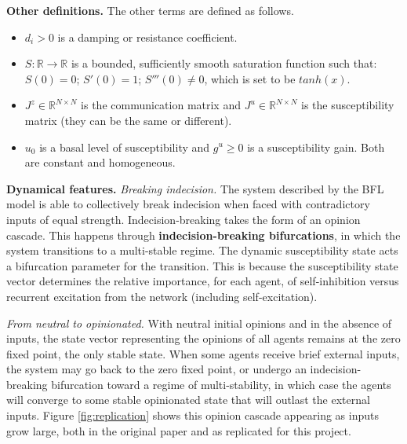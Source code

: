 \documentclass[]{article}
\begin{document}
\textbf{Other definitions.} The other terms are defined as follows. \begin{itemize}
	\item $d_{i} > 0$ is a damping or resistance coefficient. 
	\item $S: \mathbb{R} \rightarrow \mathbb{R}$ is a bounded, sufficiently smooth saturation function such that: $S(0)=0$; $S'(0)=1$; $S'''(0)\neq0$, which is set to be $tanh(x)$.
	\item $J^z \in \mathbb{R}^{N \times N}$ is the communication matrix and $J^u \in \mathbb{R}^{N \times N}$ is the susceptibility matrix (they can be the same or different).
	\item $u_0$ is a basal level of susceptibility and $g^u \geq 0$ is a susceptibility gain. Both are constant and homogeneous.
\end{itemize}

\textbf{Dynamical features.} \textit{Breaking indecision.} The system described by the BFL model is able to collectively break indecision when faced with contradictory inputs of equal strength. Indecision-breaking takes the form of an opinion cascade. This happens through \textbf{indecision-breaking bifurcations}, in which the system transitions to a multi-stable regime. The dynamic susceptibility state acts a bifurcation parameter for the transition. This is because the susceptibility state vector determines the relative importance, for each agent, of self-inhibition versus recurrent excitation from the network (including self-excitation).

\textit{From neutral to opinionated.} With neutral initial opinions and in the absence of inputs, the state vector representing the opinions of all agents remains at the zero fixed point, the only stable state. When some agents receive brief external inputs, the system may go back to the zero fixed point, or undergo an indecision-breaking bifurcation toward a regime of multi-stability, in which case the agents will converge to some stable opinionated state that will outlast the external inputs. Figure \ref{fig:replication} shows this opinion cascade appearing as inputs grow large, both in the original paper and as replicated for this project.
\end{document}
